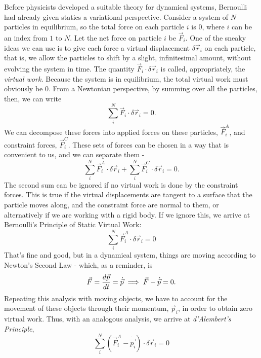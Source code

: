 Before physicists developed a suitable theory for dynamical systems, Bernoulli had already given statics a variational perspective. Consider a system of $N$ particles in equilibrium, so the total force on each particle $i$ is $0$, where $i$ can be an index from $1$ to $N$. Let the net force on particle $i$ be $\vec F_i$. One of the sneaky ideas we can use is to give each force a virtual displacement $\delta\vec r_i$ on each particle, that is, we allow the particles to shift by a slight, infinitesimal amount, without evolving the system in time. The quantity $\vec F_i \cdot \delta \vec r_i$ is called, appropriately, the \textit{virtual work.} Because the system is in equilibrium, the total virtual work must obviously be 0. From a Newtonian perspective, by summing over all the particles, then, we can write 
\[
	\sum_i^N \vec F_i \cdot \delta \vec r_i = 0. 
\]
We can decompose these forces into applied forces on these particles, $\vec F_i^A$, and constraint forces, $\vec F_i^C$. These sets of forces can be chosen in a way that is convenient to us, and we can separate them - 
\[
	\sum_i^N \vec F_i^A \cdot \delta \vec r_i + \sum_i^N \vec F_i^C \cdot \delta \vec r_i = 0.
\]
The second sum can be ignored if no virtual work is done by the constraint forces. This is true if the virtual displacements are tangent to a surface that the particle moves along, and the constraint force are normal to them, or alternatively if we are working with a rigid body. If we ignore this, we arrive at Bernoulli's Principle of Static Virtual Work: 
\[
	\sum_i^N \vec F_i^A \cdot \delta \vec r_i = 0
\]
That's fine and good, but in a dynamical system, things are moving according to Newton's Second Law - which, as a reminder, is 
\[
	\vec F = \frac{d \vec p}{d t} = \dot{\vec p} \implies \vec F - \dot{\vec p} = 0.
\]
Repeating this analysis with moving objects, we have to account for the movement of these objects through their momentum, $\vec p_i$, in order to obtain zero virtual work. Thus, with an analogous analysis, we arrive at \textit{d'Alembert's Principle}, 
\[
	\sum_i^N (\vec F_i^A - \dot{\vec {p_i}}) \cdot \delta \vec r_i = 0
\]

